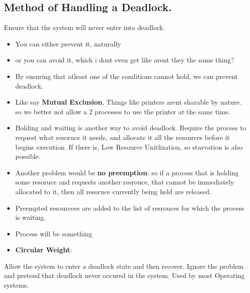 \documentclass[11pt]{article}
\begin{document}
\subsection{Method of Handling a Deadlock. }
Ensure that the system will never enter into deadlock. 
\begin{itemize}
	\item You can either prevent it, naturally 
	\item or you can avoid it, which i dont even get like arent they the same thing?
	\item By ensuring that atleast one of the conditions cannot hold, we can prevent deadlock. 
	\item Like say \textbf{Mutual Exclusion}, Things like printers arent sharable by nature. so we better not allow a 2 processes to use the printer at the same time. 
	\item Holding and waiting is another way to avoid deadlock. Require the process to request what resoruce it needs, and allocate it all the resources before it begins execution. If there is, Low Resource Unitlization, so starvation is also possible.
	\item Another problem would be \textbf{no preemption}: so if a process that is holding some resoruce and requests another resrouce, that cannot be immediately allocated to it, then all resoruce currently being held are released. 
	\item Preempted resourcees are added to the list of resrouces for which the process is waiting. 
	\item Process will be something 
	\item \textbf{Circular Weight}: 
\end{itemize}
Allow the system to enter a deadlock state and then recover. Ignore the problem and pretend that deadlock never occured in the system. Used by most Operating systems. 
\end{document}
